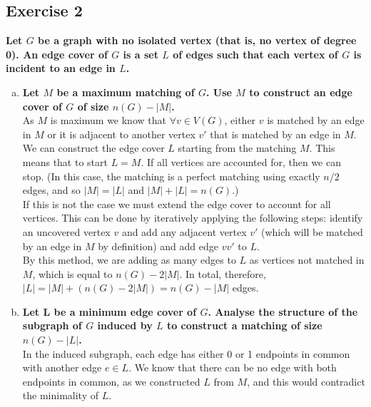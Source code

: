 \subsection*{Exercise 2}

\boldmath
\textbf{Let $G$ be a graph with no isolated vertex (that is, no vertex of degree 0). An edge cover of $G$ is a set $L$ of edges such that each vertex of $G$ is incident to an edge in $L$.}
\unboldmath

\begin{enumerate}[a)]
    \boldmath
    \item \textbf{Let $M$ be a maximum matching of $G$. Use $M$ to construct an edge cover of $G$ of size $n(G)-|M|$.} \\
    \unboldmath
    \linebreak 
    As $M$ is maximum we know that $\forall v \in V(G)$, either $v$ is matched by an edge in $M$ or it is adjacent to another vertex $v'$ that is matched by an edge in $M$. \\
    \linebreak 
    We can construct the edge cover $L$ starting from the matching $M$. This means that to start $L = M$. If all vertices are accounted for, then we can stop. (In this case, the matching is a perfect matching using exactly $n/2$ edges, and so $|M| = |L|$ and $|M| + |L| = n(G)$.)\\
    \linebreak 
    If this is not the case we must extend the edge cover to account for all vertices. This can be done by iteratively applying the following steps: identify an uncovered vertex $v$ and add any adjacent vertex $v'$ (which will be matched by an edge in $M$ by definition) and add edge $vv'$ to $L$. \\
    \linebreak
    By this method, we are adding as many edges to $L$ as vertices not matched in $M$, which is equal to $n(G) - 2|M|$. In total, therefore, $|L| = |M| + (n(G) - 2|M|) = n(G) - |M|$ edges. 
    \boldmath
    \item \textbf{Let L be a minimum edge cover of $G$. Analyse the structure of the subgraph of $G$ induced by $L$ to construct a matching of size $n(G)-|L|$.} \\
    \unboldmath
    \linebreak 
    In the induced subgraph, each edge has either 0 or 1 endpoints in common with another edge $e \in L$. We know that there can be no edge with both endpoints in common, as we constructed $L$ from $M$, and this would contradict the minimality of $L$. \\

\end{enumerate}

